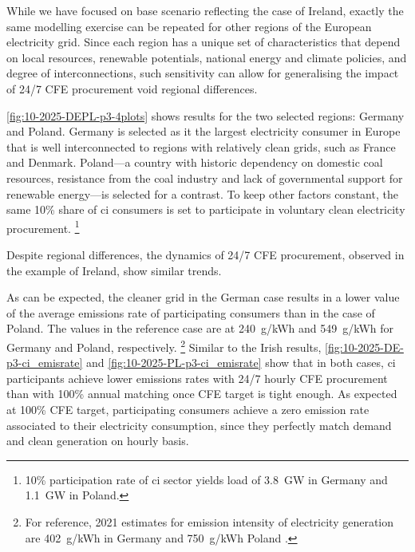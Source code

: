 While we have focused on base scenario reflecting the case of Ireland, exactly the same modelling exercise can be repeated for other regions of the European electricity grid.
Since each region has a unique set of characteristics that depend on local resources, renewable potentials, national energy and climate policies, and degree of interconnections, such sensitivity can allow for generalising the impact of 24/7 CFE procurement void regional differences.

\cref{fig:10-2025-DEPL-p3-4plots} shows results for the two selected regions: Germany and Poland. 
Germany is selected as it the largest electricity consumer in Europe that is well interconnected to regions with relatively clean grids, such as France and Denmark.
Poland---a country with  historic dependency on domestic coal resources, resistance from the coal industry and lack of governmental support for renewable energy---is selected for a contrast. To keep other factors constant, the same 10\% share of \gls{ci} consumers is set to participate in voluntary clean electricity procurement.%
\footnote{10\% participation rate of \gls{ci} sector yields load of 3.8~GW in Germany and 1.1~GW in Poland.}

Despite regional differences, the dynamics of 24/7 CFE procurement, observed in the example of Ireland, show similar trends. 

As can be expected, the cleaner grid in the German case results in a lower value of the average emissions rate of participating consumers than in the case of Poland. 
The values in the reference case are at 240~g\co/kWh and 549~g\co/kWh for Germany and Poland, respectively.%
\footnote{For reference, 2021 estimates for emission intensity of electricity generation are 402~g\co/kWh in Germany and 750~g\co/kWh Poland \cite{EEA-europa-web}.}
Similar to the Irish results, \cref{fig:10-2025-DE-p3-ci_emisrate} and \cref{fig:10-2025-PL-p3-ci_emisrate} show that in both cases, \gls{ci} participants achieve lower emissions rates with 24/7 hourly CFE procurement than with 100\% annual matching once CFE target is tight enough. 
As expected at 100\% CFE target, participating consumers achieve a zero emission rate associated to their electricity consumption, since they perfectly match demand and clean generation on hourly basis.

